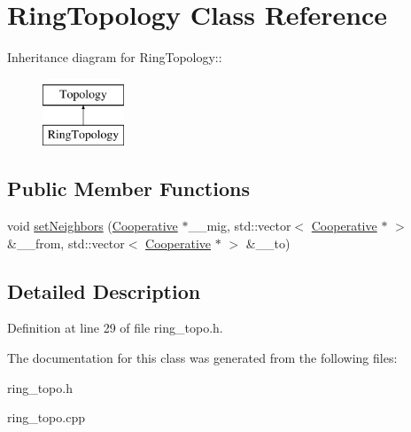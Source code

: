 \hypertarget{classRingTopology}{
\section{Ring\-Topology Class Reference}
\label{classRingTopology}
}
Inheritance diagram for Ring\-Topology::\begin{figure}[H]
\begin{center}
\leavevmode
\includegraphics[height=2cm]{classRingTopology}
\end{center}
\end{figure}
\subsection*{Public Member Functions}
\begin{CompactItemize}
\item 
\hypertarget{classRingTopology_292a7746993788f96042f2f628cfcbc5}{
void \hyperlink{classRingTopology_292a7746993788f96042f2f628cfcbc5}{set\-Neighbors} (\hyperlink{classCooperative}{Cooperative} $\ast$\_\-\_\-mig, std::vector$<$ \hyperlink{classCooperative}{Cooperative} $\ast$ $>$ \&\_\-\_\-from, std::vector$<$ \hyperlink{classCooperative}{Cooperative} $\ast$ $>$ \&\_\-\_\-to)}
\label{classRingTopology_292a7746993788f96042f2f628cfcbc5}

\end{CompactItemize}


\subsection{Detailed Description}




Definition at line 29 of file ring\_\-topo.h.

The documentation for this class was generated from the following files:\begin{CompactItemize}
\item 
ring\_\-topo.h\item 
ring\_\-topo.cpp\end{CompactItemize}
